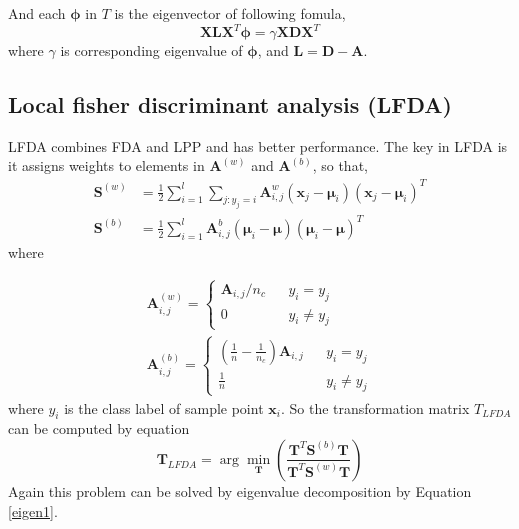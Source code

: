 And each $\bm{\phi}$ in $T$ is the eigenvector of following fomula,
 \begin{equation}
\bm{X}\bm{L}\bm{X}^T\bm{\phi} = \gamma\bm{X}\bm{D}\bm{X}^T
\end{equation}
where $\gamma$ is corresponding eigenvalue of $\bm{\phi}$, and $\bm{L} = \bm{D} - \bm{A}$.

\subsection{Local fisher discriminant analysis (LFDA)}
\indent LFDA \cite{LFDA} combines FDA and LPP and has better performance. The key in LFDA is it assigns weights to elements in $\bm{A}^{(w)}$ and $\bm{A}^{(b)}$, so that,
\begin{equation}
\begin{aligned}
\bm{S}^{(w)} &= \frac{1}{2}\sum _{i=1}^l\sum_{j:y_j = i} \bm{A}_{i,j}^w (\bm{x}_j - \bm{\mu}_i)(\bm{x}_j - \bm{\mu}_i)^T \\
\bm{S}^{(b)} &=  \frac{1}{2}\sum _{i=1}^l \bm{A}_{i,j}^b(\bm{\mu}_i - \bm{\mu})(\bm{\mu}_i - \bm{\mu})^T
\end{aligned}
\end{equation}
where 

\begin{equation}
\begin{aligned}
\bm{A}_{i,j}^{(w)} = \left \{ 
\begin{array}{rcl}
\bm{A}_{i,j}/n_c &  &y_i = y_j \\
0 & & {y_i \ne y_j }
\end{array}
  \right.  \\
  \bm{A}_{i,j}^{(b)} = \left \{ 
\begin{array}{rcl}
(\frac{1}{n} - \frac{1}{n_c})  \bm{A}_{i,j} &  &{y_i = y_j }\\
\frac{1}{n} & & {y_i \ne y_j }
\end{array}
  \right. 
 \end{aligned}
\end{equation}
where $y_i$ is the class label of sample point $\bm{x}_i$. So the transformation matrix $T_{LFDA}$ can be computed by equation
\begin{equation}\label{eigencompute1} 
\bm{T}_{LFDA}  = \arg\min_{\bm{T}} (\frac{\bm{T}^T\bm{S}^{(b)}\bm{T}}{\bm{T}^T\bm{S}^{(w)}\bm{T}})
\end{equation}
Again this problem can be solved by eigenvalue decomposition by Equation \ref{eigen1}. 



